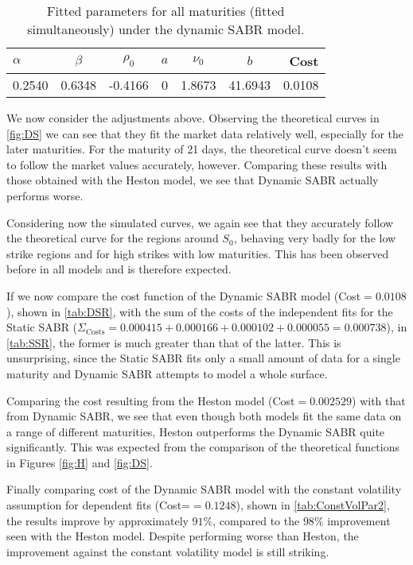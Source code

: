 \begin{table}[H]
    \centering
        \renewcommand{\arraystretch}{0.8}
\begin{tabular}{@{}lcccccr@{}}
\toprule
$\alpha$ & $\beta$ & $\rho_0$ & $a$ & $\nu_0$ & $b$ & Cost \\ \midrule
0.2540 & 0.6348 & -0.4166 & 0 & 1.8673 & 41.6943 & 0.0108 \\
\bottomrule
\end{tabular}
  \caption[Fitted parameters for all maturities (fitted simultaneously) under the dynamic SABR model.]{Fitted parameters for all maturities (fitted simultaneously) under the dynamic SABR model.}
  \label{tab:DSR}
\end{table}


We now consider the adjustments above. Observing the theoretical curves in \autoref{fig:DS} we can see that they fit the market data relatively well, especially for the later maturities. For the maturity of 21 days, the theoretical curve doesn't seem to follow the market values accurately, however. Comparing these results with those obtained with the Heston model, we see that Dynamic SABR actually performs worse.

Considering now the simulated curves, we again see that they accurately follow the theoretical curve for the regions around $S_0$, behaving very badly for the low strike regions and for high strikes with low maturities. This has been observed before in all models and is therefore expected.

If we now compare the cost function of the Dynamic SABR model (Cost$=0.0108$), shown in \autoref{tab:DSR}, with the sum of the costs of the independent fits for the Static SABR ($\Sigma_{\mathrm{Costs}}=0.000415+0.000166+0.000102+0.000055=0.000738$), in \autoref{tab:SSR}, the former is much greater than that of the latter.
This is unsurprising, since the Static SABR fits only a small amount of data for a single maturity and Dynamic SABR attempts to model a whole surface.

Comparing the cost resulting from the Heston model (Cost$=0.002529$) with that from Dynamic SABR, we see that even though both models fit the same data on a range of different maturities, Heston outperforms the Dynamic SABR quite significantly. This was expected from the comparison of the theoretical functions in Figures \ref{fig:H} and \ref{fig:DS}.

Finally comparing cost of the Dynamic SABR model with the constant volatility assumption for dependent fits (Cost=$=0.1248$), shown in \autoref{tab:ConstVolPar2}, the results improve by approximately $91\%$, compared to the $98\%$ improvement seen with the Heston model. Despite performing worse than Heston, the improvement against the constant volatility model is still striking.

